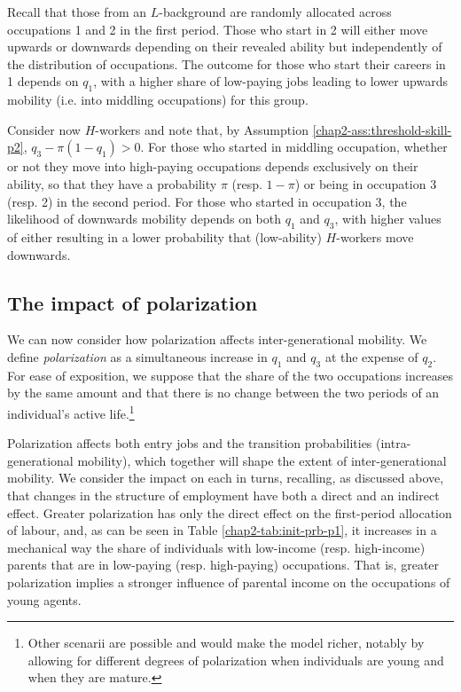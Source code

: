 Recall that those from an $L$-background are randomly allocated across occupations 1 and 2 in the first period. Those who start in 2 will either move upwards or downwards depending on their revealed ability but independently of the distribution of occupations. The outcome for those who start their careers in 1 depends on $q_1$, with a higher share of low-paying jobs leading to lower upwards mobility (i.e. into middling occupations) for this group. 

Consider now $H$-workers and note that, by Assumption \ref{chap2-ass:threshold-skill-p2}, $q_3 - \pi (1-q_{1})>0$. For those who started in middling occupation, whether or not they move into high-paying occupations depends exclusively on their ability, so that they have a probability $\pi$ (resp. $1-\pi$) or being in occupation 3 (resp. 2) in the second period. For those who started in occupation 3, the likelihood of downwards mobility depends on both $q_1$ and $q_3$, with higher values of either resulting in a lower probability that (low-ability) $H$-workers move downwards.

\subsection{The impact of polarization} \label{chap2-model-polarization}

We can now consider how polarization affects inter-generational mobility. We define \textit{polarization} as a simultaneous increase in $q_{1}$ and $q_{3}$ at the expense of $q_{2}$. For ease of exposition, we suppose that the share of the two occupations increases by the same amount and that there is no change between the two periods of an individual's active life.\footnote{Other scenarii are possible and would make the model richer, notably by allowing for different degrees of polarization when individuals are young and when they are mature.}

Polarization affects both entry jobs and the transition probabilities (intra-generational mobility), which together will shape the extent of inter-generational mobility. We consider the impact on each in turns, recalling, as discussed above, that changes in the structure of employment have both a direct and an indirect effect. Greater polarization has only the direct effect on the first-period allocation of labour, and, as can be seen in Table \ref{chap2-tab:init-prb-p1}, it increases in a mechanical way the share of individuals with low-income (resp. high-income) parents that are in low-paying (resp. high-paying) occupations. That is, greater polarization implies a stronger influence of parental income on the occupations of young agents. 


